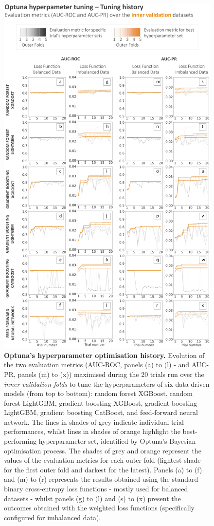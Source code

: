 \begin{figure}[htbp]
\centering
\includegraphics[scale=0.85]{optuna_history.png}
\caption{\textbf{Optuna's hyperparameter optimisation history.} Evolution of the two evaluation metrics (AUC-ROC, panels (a) to (l) - and AUC-PR, panels (m) to (x)) maximised during the 20 trials run over the \textcolor{colourInnerValidation}{\textit{inner validation folds}} to tune the hyperparameters of six data-driven models (from top to bottom): random forest XGBoost, random forest LightGBM, gradient boosting XGBoost, gradient boosting LightGBM, gradient boosting CatBoost, and feed-forward neural network. The lines in shades of grey indicate individual trial performances, whilst lines in shades of orange highlight the best-performing hyperparameter set, identified by Optuna's Bayesian optimisation process. The shades of grey and orange represent the values of the evaluation metrics for each outer fold (lightest shade for the first outer fold and darkest for the latest). Panels (a) to (f) and (m) to (r) represents the results obtained using the standard binary cross-entropy loss functions - mostly used for balanced datasets - whilst panels (g) to (l) and (s) to (x) present the outcomes obtained with the weighted loss functions (specifically configured for imbalanced data).}

\end{figure}
